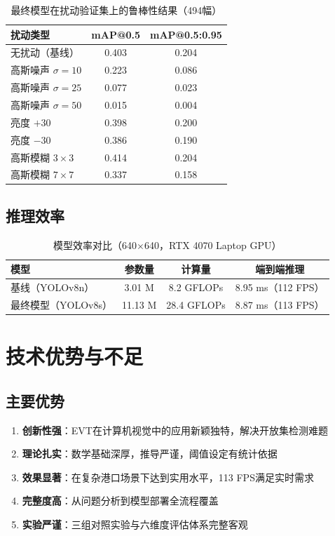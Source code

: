 \documentclass[12pt,a4paper]{ctexart}
\theoremstyle{cumcm}
\begin{document}
\begin{table}[H]
\centering
{}
\caption{最终模型在扰动验证集上的鲁棒性结果（494幅）}
\begin{tabular}{lcc}
\toprule
\textbf{扰动类型} & \textbf{mAP@0.5} & \textbf{mAP@0.5:0.95} \\
\midrule
无扰动（基线） & 0.403 & 0.204 \\
高斯噪声 $\sigma=10$ & 0.223 & 0.086 \\
高斯噪声 $\sigma=25$ & 0.077 & 0.023 \\
高斯噪声 $\sigma=50$ & 0.015 & 0.004 \\
亮度 $+30$ & 0.398 & 0.200 \\
亮度 $-30$ & 0.386 & 0.190 \\
高斯模糊 $3\times3$ & 0.414 & 0.204 \\
高斯模糊 $7\times7$ & 0.337 & 0.158 \\
\bottomrule
\end{tabular}
\end{table}

\subsection{推理效率}

\begin{table}[H]
\centering
{}
\caption{模型效率对比（640$\times$640，RTX 4070 Laptop GPU）}
\begin{tabular}{lccc}
\toprule
\textbf{模型} & \textbf{参数量} & \textbf{计算量} & \textbf{端到端推理} \\
\midrule
基线（YOLOv8n） & 3.01 M & 8.2 GFLOPs & 8.95 ms（112 FPS） \\
最终模型（YOLOv8s） & 11.13 M & 28.4 GFLOPs & 8.87 ms（113 FPS） \\
\bottomrule
\end{tabular}
\end{table}

\section{技术优势与不足}

\subsection{主要优势}

\begin{enumerate}[leftmargin=2.2em,itemsep=2pt]
\item \textbf{创新性强}：EVT在计算机视觉中的应用新颖独特，解决开放集检测难题
\item \textbf{理论扎实}：数学基础深厚，推导严谨，阈值设定有统计依据
\item \textbf{效果显著}：在复杂港口场景下达到实用水平，113 FPS满足实时需求
\item \textbf{完整度高}：从问题分析到模型部署全流程覆盖
\item \textbf{实验严谨}：三组对照实验与六维度评估体系完整客观
\end{enumerate}
\end{document}
